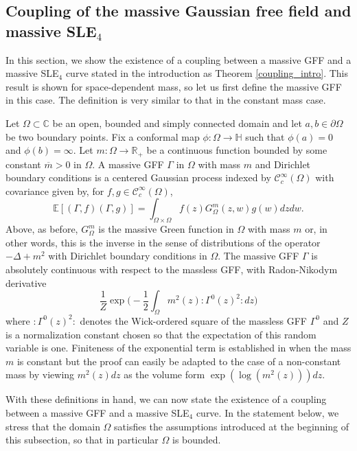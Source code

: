 \documentclass{article}
\newcommand{\EE}{{\mathbb{E}}}
\theoremstyle{definition}
\theoremstyle{remark}
\theoremstyle{remark}
\begin{document}
\subsection{Coupling of the massive Gaussian free field and massive SLE$_4$}

In this section, we show the existence of a coupling between a massive GFF and a massive SLE$_4$ curve stated in the introduction as Theorem \ref{coupling_intro}. This result is shown for space-dependent mass, so let us first define the massive GFF in this case. The definition is very similar to that in the constant mass case.

Let $\Omega \subset \mathbb{C}$ be an open, bounded and simply connected domain and let $a, b \in \partial \Omega$ be two boundary points. Fix a conformal map $\phi: \Omega \to \mathbb{H}$ such that $\phi(a)=0$ and $\phi(b)=\infty$. Let $m: \Omega \to \mathbb{R}_{+}$ be a continuous function bounded by some constant $\overline{m} > 0$ in $\Omega$. A massive GFF $\Gamma$ in $\Omega$ with mass $m$ and Dirichlet boundary conditions is a centered Gaussian process indexed by $\mathcal{C}_c^{\infty}(\Omega)$ with covariance given by, for $f,g \in \mathcal{C}_c^{\infty}(\Omega)$,
\begin{equation*}
    \EE[(\Gamma,f)(\Gamma,g)] = \int_{\Omega \times \Omega} f(z)G_{\Omega}^{m}(z,w)g(w) dz dw.
\end{equation*}
Above, as before, $G_{\Omega}^{m}$ is the massive Green function in $\Omega$ with mass $m$ or, in other words, this is the inverse in the sense of distributions of the operator $-\Delta + m^2$ with Dirichlet boundary conditions in $\Omega$. The massive GFF $\Gamma$ is absolutely continuous with respect to the massless GFF, with Radon-Nikodym derivative
\begin{equation*}
    \frac{1}{Z} \exp \bigg( -\frac{1}{2}\int_{\Omega} m^2(z) :\Gamma^{0}(z)^2: dz \bigg)
\end{equation*}
where $:\Gamma^{0}(z)^2:$ denotes the Wick-ordered square of the massless GFF $\Gamma^0$ and $Z$ is a normalization constant chosen so that the expectation of this random variable is one. Finiteness of the exponential term is established in \cite[Lemma~3.5]{mGFF_cont} when the mass $m$ is constant but the proof can easily be adapted to the case of a non-constant mass by viewing $m^2(z)dz$ as the volume form $\exp(\log(m^2(z)))dz$.

With these definitions in hand, we can now state the existence of a coupling between a massive GFF and a massive SLE$_4$ curve. In the statement below, we stress that the domain $\Omega$ satisfies the assumptions introduced at the beginning of this subsection, so that in particular $\Omega$ is bounded.
\end{document}
